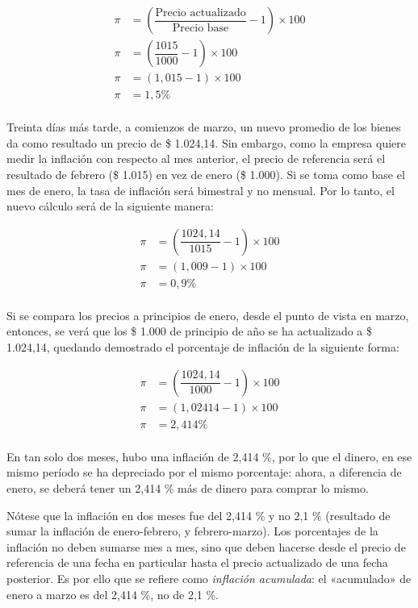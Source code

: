 \documentclass[12pt,a4paper,twoside]{book}
\begin{document}
\begin{align*}
\pi &= \left( \dfrac{\text{Precio actualizado}}{\text{Precio base}} - 1 \right) \times 100 \\
\pi &= \left( \dfrac{1015}{1000} -1 \right) \times 100 \\
\pi &= \left( 1,015 - 1 \right) \times 100 \\
\pi &= 1,5 \% \\
\end{align*}

Treinta días más tarde, a comienzos de marzo, un nuevo promedio de los bienes da como resultado un precio de \$ 1.024,14. Sin embargo, como la empresa quiere medir la inflación con respecto al mes anterior, el precio de referencia será el resultado de febrero (\$ 1.015) en vez de enero (\$ 1.000). Si se toma como base el mes de enero, la tasa de inflación será bimestral y no mensual. Por lo tanto, el nuevo cálculo será de la siguiente manera:

\begin{align*}
\pi &= \left( \dfrac{1024,14}{1015} -1 \right) \times 100 \\
\pi &= \left( 1,009 - 1 \right) \times 100 \\
\pi &= 0,9 \% \\
\end{align*}

Si se compara los precios a principios de enero, desde el punto de vista en marzo, entonces, se verá que los \$ 1.000 de principio de año se ha actualizado a \$ 1.024,14, quedando demostrado el porcentaje de inflación de la siguiente forma:

\begin{align*}
\pi &= \left( \dfrac{1024,14}{1000} -1 \right) \times 100 \\
\pi &= \left( 1,02414 - 1 \right) \times 100 \\
\pi &= 2,414 \% \\
\end{align*}

En tan solo dos meses, hubo una inflación de 2,414 \%, por lo que el dinero, en ese mismo período se ha depreciado por el mismo porcentaje: ahora, a diferencia de enero, se deberá tener un 2,414 \% más de dinero para comprar lo mismo.

Nótese que la inflación en dos meses fue del 2,414 \% y no 2,1 \% (resultado de sumar la inflación de enero-febrero, y febrero-marzo). Los porcentajes de la inflación no deben sumarse mes a mes, sino que deben hacerse desde el precio de referencia de una fecha en particular hasta el precio actualizado de una fecha posterior. Es por ello que se refiere como \textit{inflación acumulada}: el «acumulado» de enero a marzo es del 2,414 \%, no de 2,1 \%.
\end{document}
